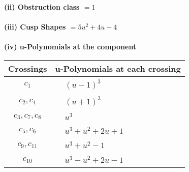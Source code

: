 \documentclass[1p]{elsarticle_modified}
\theoremstyle{definition}
\begin{document}
\flushleft \textbf{(ii) Obstruction class $= 1$}\\~\\
\flushleft \textbf{(iii) Cusp Shapes $= 5 u^2+4 u+4$}\\~\\
\newpage\renewcommand{\arraystretch}{1}
\flushleft \textbf{(iv) u-Polynomials at the component}\newline \\
\begin{tabular}{m{50pt}|m{274pt}}
Crossings & \hspace{64pt}u-Polynomials at each crossing \\
\hline $$\begin{aligned}c_{1}\end{aligned}$$&$\begin{aligned}
&(u-1)^3
\end{aligned}$\\
\hline $$\begin{aligned}c_{2},c_{4}\end{aligned}$$&$\begin{aligned}
&(u+1)^3
\end{aligned}$\\
\hline $$\begin{aligned}c_{3},c_{7},c_{8}\end{aligned}$$&$\begin{aligned}
&u^3
\end{aligned}$\\
\hline $$\begin{aligned}c_{5},c_{6}\end{aligned}$$&$\begin{aligned}
&u^3+u^2+2 u+1
\end{aligned}$\\
\hline $$\begin{aligned}c_{9},c_{11}\end{aligned}$$&$\begin{aligned}
&u^3+u^2-1
\end{aligned}$\\
\hline $$\begin{aligned}c_{10}\end{aligned}$$&$\begin{aligned}
&u^3- u^2+2 u-1
\end{aligned}$\\
\hline
\end{tabular}\\~\\
\newpage\renewcommand{\arraystretch}{1}
\end{document}
